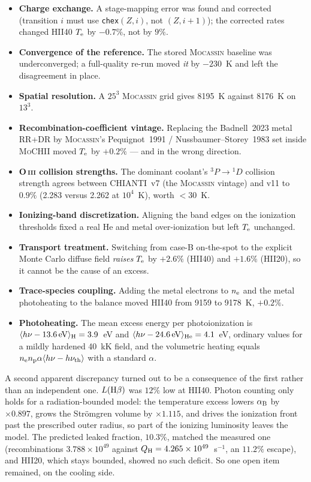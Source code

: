 \documentclass[english,a4paper]{my_memo}
\newcommand{\code}[1]{\texttt{#1}}
\newcommand{\MoCHII}{\textsc{MoCHII}}
\newcommand{\Mocassin}{\textsc{Mocassin}}
\newcommand{\OIII}{O\,\textsc{iii}}
\newcommand{\Te}{T_{\rm e}}
\newcommand{\nel}{n_{\rm e}}
\begin{document}
\begin{itemize}\itemsep2pt
\item \textbf{Charge exchange.}  A stage-mapping error was found and corrected
      (transition $i$ must use \code{chex}$(Z,i)$, not $(Z,i+1)$); the
      corrected rates changed HII40 $\Te$ by $-0.7\%$, not by $9\%$.
\item \textbf{Convergence of the reference.}  The stored \Mocassin{} baseline
      was underconverged; a full-quality re-run moved \emph{it} by $-230$~K
      and left the disagreement in place.
\item \textbf{Spatial resolution.}  A $25^3$ \Mocassin{} grid gives 8195~K
      against 8176~K on $13^3$.
\item \textbf{Recombination-coefficient vintage.}  Replacing the Badnell~2023
      metal RR+DR by \Mocassin{}'s Pequignot~1991 / Nussbaumer--Storey~1983
      set inside \MoCHII{} moved $\Te$ by $+0.2\%$ --- and in the wrong
      direction.
\item \textbf{\OIII{} collision strengths.}  The dominant coolant's
      $^3P \to {}^1D$ collision strength agrees between CHIANTI~v7 (the
      \Mocassin{} vintage) and v11 to $0.9\%$ (2.283 versus 2.262 at
      $10^4$~K), worth $<30$~K.
\item \textbf{Ionizing-band discretization.}  Aligning the band edges on the
      ionization thresholds fixed a real He and metal over-ionization but left
      $\Te$ unchanged.
\item \textbf{Transport treatment.}  Switching from case-B on-the-spot to the
      explicit Monte Carlo diffuse field \emph{raises} $\Te$ by $+2.6\%$
      (HII40) and $+1.6\%$ (HII20), so it cannot be the cause of an excess.
\item \textbf{Trace-species coupling.}  Adding the metal electrons to $\nel$
      and the metal photoheating to the balance moved HII40 from 9159 to
      9178~K, $+0.2\%$.
\item \textbf{Photoheating.}  The mean excess energy per photoionization is
      $\langle h\nu - 13.6\,{\rm eV}\rangle_{\rm H} = 3.9$~eV and
      $\langle h\nu - 24.6\,{\rm eV}\rangle_{\rm He} = 4.1$~eV, ordinary
      values for a mildly hardened 40~kK field, and the volumetric heating
      equals $\nel n_{\rm p}\alpha\langle h\nu - h\nu_{\rm th}\rangle$ with a
      standard $\alpha$.
\end{itemize}

A second apparent discrepancy turned out to be a consequence of the first
rather than an independent one.  $L({\rm H}\beta)$ was $12\%$ low at HII40.
Photon counting only holds for a radiation-bounded model: the temperature
excess lowers $\alpha_{\rm B}$ by $\times 0.897$, grows the Str\"omgren volume
by $\times 1.115$, and drives the ionization front past the prescribed outer
radius, so part of the ionizing luminosity leaves the model.  The predicted
leaked fraction, $10.3\%$, matched the measured one (recombinations
$3.788\times10^{49}$ against $Q_{\rm H} = 4.265\times10^{49}$~s$^{-1}$, an
$11.2\%$ escape), and HII20, which stays bounded, showed no such deficit.
So one open item remained, on the cooling side.
\end{document}
